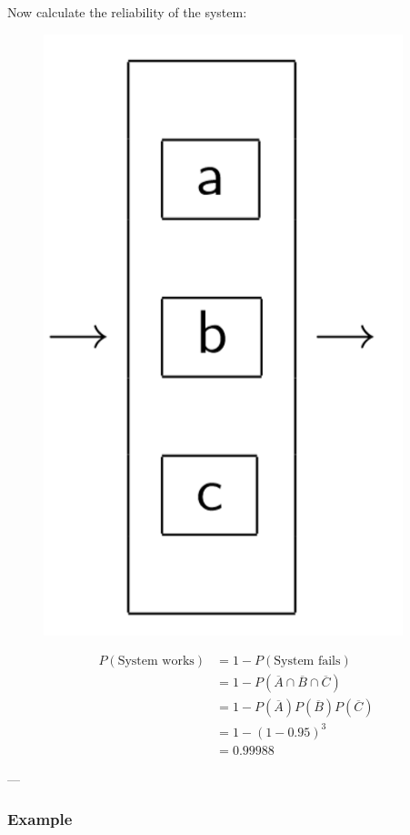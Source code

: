 \documentclass{article}
\begin{document}
Now calculate the reliability of the system:
\begin{figure}[ht!]
\centering
\includegraphics[scale=0.5]{Parallel.png}
\end{figure}
\begin{align*}P(\text{System works}) & = 1- P(\text{System fails}) \\
& = 1 - P(\overline{A} \cap \overline{B} \cap \overline{C}) \\
& = 1 - P(\overline{A})P( \overline{B} )P( \overline{C}) \\
& = 1 - (1-0.95)^3 \\
& = 0.99988 
\end{align*}

---

\subsubsection*{Example}
\end{document}
